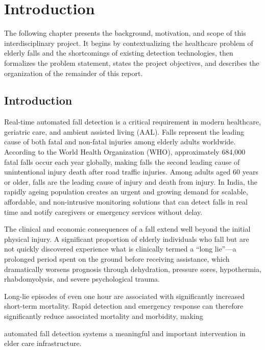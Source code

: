 \chapter{Introduction}



The following chapter presents the background, motivation, and scope of this interdisciplinary project. It begins by contextualizing the healthcare problem of elderly falls and the shortcomings of existing detection technologies, then formalizes the problem statement, states the project objectives, and describes the organization of the remainder of this report. 

\section{Introduction}

Real-time automated fall detection is a critical requirement in modern healthcare, geriatric care, and ambient assisted living (AAL). Falls represent the leading cause of both fatal and non-fatal injuries among elderly adults worldwide. According to the World Health Organization (WHO), approximately 684,000 fatal falls occur each year globally, making falls the second leading cause of unintentional injury death after road traffic injuries. Among adults aged 60 years or older, falls are the leading cause of injury and death from injury. In India, the rapidly ageing population creates an urgent and growing demand for scalable, affordable, and non-intrusive monitoring solutions that can detect falls in real time and notify caregivers or emergency services without delay. 

The clinical and economic consequences of a fall extend well beyond the initial physical injury. A significant proportion of elderly individuals who fall but are not quickly discovered experience what is clinically termed a ``long lie''---a prolonged period spent on the ground before receiving assistance, which dramatically worsens prognosis through dehydration, pressure sores, hypothermia, rhabdomyolysis, and severe psychological trauma. 


Long-lie episodes of even one hour are associated with significantly increased short-term mortality. Rapid detection and emergency response can therefore significantly reduce associated mortality and morbidity, making 







automated fall detection systems a meaningful and important intervention in elder care infrastructure. 

